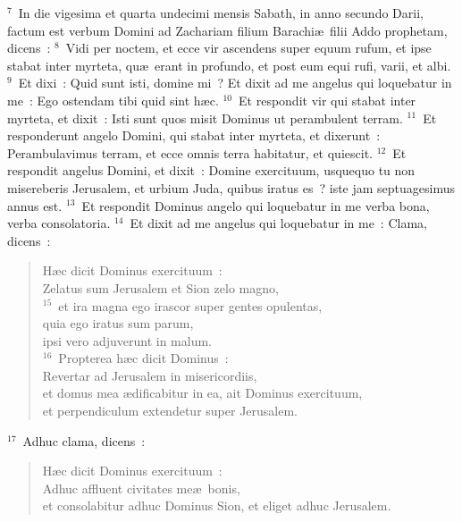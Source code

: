 ${}^{7}$~In die vigesima et quarta undecimi mensis Sabath, in anno secundo Darii, factum est verbum Domini ad Zachariam filium Barachi\ae\ filii Addo prophetam, dicens~:
${}^{8}$~Vidi per noctem, et ecce vir ascendens super equum rufum, et ipse stabat inter myrteta, qu\ae\ erant in profundo, et post eum equi rufi, varii, et albi.
${}^{9}$~Et dixi~: Quid sunt isti, domine mi~? Et dixit ad me angelus qui loquebatur in me~: Ego ostendam tibi quid sint h\ae c.
${}^{10}$~Et respondit vir qui stabat inter myrteta, et dixit~: Isti sunt quos misit Dominus ut perambulent terram.
${}^{11}$~Et responderunt angelo Domini, qui stabat inter myrteta, et dixerunt~: Perambulavimus terram, et ecce omnis terra habitatur, et quiescit.
${}^{12}$~Et respondit angelus Domini, et dixit~: Domine exercituum, usquequo tu non misereberis Jerusalem, et urbium Juda, quibus iratus es~? iste jam septuagesimus annus est.
${}^{13}$~Et respondit Dominus angelo qui loquebatur in me verba bona, verba consolatoria.
${}^{14}$~Et dixit ad me angelus qui loquebatur in me~: Clama, dicens~: \begin{flushleft}\begin{verse}H\ae c dicit Dominus exercituum~:\\ Zelatus sum Jerusalem et Sion zelo magno,\\
${}^{15}$~et ira magna ego irascor super gentes opulentas,\\ quia ego iratus sum parum,\\ ipsi vero adjuverunt in malum.\\
${}^{16}$~Propterea h\ae c dicit Dominus~:\\ Revertar ad Jerusalem in misericordiis,\\ et domus mea \ae dificabitur in ea, ait Dominus exercituum,\\ et perpendiculum extendetur super Jerusalem.\end{verse}\end{flushleft}


${}^{17}$~Adhuc clama, dicens~: \begin{flushleft}\begin{verse}H\ae c dicit Dominus exercituum~:\\ Adhuc affluent civitates me\ae\ bonis,\\ et consolabitur adhuc Dominus Sion, et eliget adhuc Jerusalem.\end{verse}\end{flushleft}


